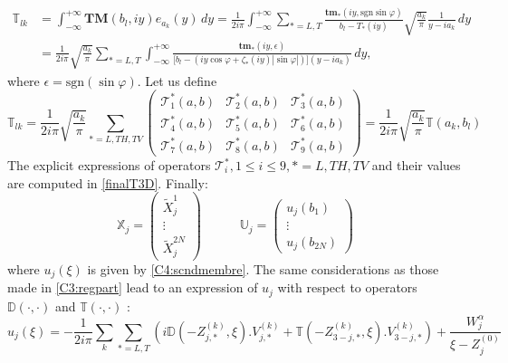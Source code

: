 \begin{equation}
\begin{split}
\mathbb{T}_{lk}&=\int_{-\infty}^{+\infty} \textbf{TM}(b_l,iy)e_{a_k}(y) \, dy 
=\frac{1}{2i\pi} \int_{-\infty}^{+\infty} \sum_{*=L,T} \frac{\textbf{tm}_* (iy, \mbox{sgn} \sin \varphi)}{b_l-T_*(iy)} \sqrt{\frac{a_k}{\pi}}\frac{1}{y-ia_k}\,dy \\
&=\frac{1}{2i\pi}\sqrt{\frac{a_k}{\pi}}\sum_{*=L,T} \int_{-\infty}^{+\infty} \frac{\textbf{tm}_*(iy,\epsilon)}{\lbrack b_l-(iy \cos \varphi +  \zeta_*(iy)| \sin \varphi|)\rbrack(y-ia_k)} \, dy,
\end{split}
\end{equation}
where $\epsilon= \mbox{sgn}( \sin \varphi)$. Let us define
\begin{equation}
\mathbb{T}_{lk}=\frac{1}{2i\pi}\sqrt{\frac{a_k}{\pi}}
\sum_{*=L,TH,TV}
\begin{pmatrix}
\mathcal{T}_1^*(a,b) &  \mathcal{T}_2^*(a,b) &\mathcal{T}_3^*(a,b) \\
\mathcal{T}_4^*(a,b) &\mathcal{T}_5^*(a,b)&\mathcal{T}_6^*(a,b)\\
\mathcal{T}_7^*(a,b)&\mathcal{T}_8^*(a,b)&\mathcal{T}_9^*(a,b)
\end{pmatrix}
=\frac{1}{2i\pi}\sqrt{\frac{a_k}{\pi}}\mathbb{T}(a_k,b_l)
\label{Tab}
\end{equation}
The explicit expressions of operators $\mathcal{T}_i^*, 1\leq i\leq9, *=L,TH,TV$ and their values are computed in \ref{finalT3D}. Finally:
\begin{equation}
\mathbb{X}_j=
\begin{pmatrix}
\tilde{X}_j^1\\
\vdots \\
\tilde{X}_j^{2N}
\end{pmatrix}
\hspace{3em}
\mathbb{U}_j=
\begin{pmatrix}
u_j(b_1)\\
\vdots \\
u_j(b_{2N})
\end{pmatrix}
\end{equation}
where $u_j(\xi)$ is given by \eqref{C4:scndmembre}. The same considerations as those made in \ref{C3:regpart} lead to an expression of $u_j$ with respect to operators $\mathbb{D}(\cdot,\cdot)$ and $\mathbb{T}(\cdot,\cdot)$ :
\begin{equation}
u_j(\xi)=-\frac{1}{2i\pi}\sum_{k}\sum_{*=L,T}\left(i\mathbb{D}(-Z_{j,*}^{(k)},\xi).V_{j,*}^{(k)}+\mathbb{T}(-Z_{3-j,*}^{(k)},\xi).V_{3-j,*}^{(k)} \right) +\frac{W_j^{\alpha}}{\xi-Z_j^{(0)}}
\label{C4:uDT}
\end{equation}

